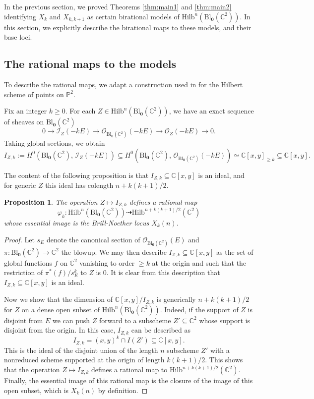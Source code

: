 \documentclass[12pt]{amsart}
\newcommand{\Hilb}{\mathrm{Hilb}}
\newcommand{\C}{\mathbb{C}}
\renewcommand{\P}{\mathbb{P}}
\newcommand{\CO}{\mathcal{O}}
\newcommand{\Bl}{\mathrm{Bl}}
\numberwithin{equation}{section}
\newtheorem{proposition}[theorem]{Proposition}
\theoremstyle{definition}
\begin{document}
In the previous section, we proved Theorems \ref{thm:main1} and \ref{thm:main2} identifying $X_k$ and $X_{k,k+1}$ as certain birational models of $\Hilb^n(\Bl_{\mathbf{0}}(\C^2))$. In this section, we explicitly describe the birational maps to these models, and their base loci.

\subsection{The rational maps to the models}

To describe the rational maps, we adapt a construction used in \cite{ABCH} for the Hilbert scheme of points on $\P^2$.

Fix an integer $k\geq0$. For each $Z\in \Hilb^n(\Bl_{\mathbf{0}}(\C^2))$, we have an exact sequence of sheaves on $\Bl_{\mathbf{0}}(\C^2)$
\[ 0\to \mathcal{I}_{Z}(-kE) \to \CO_{\Bl_{\mathbf{0}}(\C^2)}(-kE) \to \CO_Z(-kE) \to 0. \]
Taking global sections, we obtain  
\begin{equation*}
    I_{Z,k}:= H^0\left(\Bl_{\mathbf{0}}(\C^2), \, \mathcal{I}_Z(-kE)\right) \subseteq H^0\left(\Bl_{\mathbf{0}}(\C^2), \, \CO_{\Bl_{\mathbf{0}}(\C^2)}(-kE)\right) \simeq \C[x,y]_{\geq k}\subseteq \C[x,y].
\end{equation*} 

The content of the following proposition is that $I_{Z,k}\subseteq \C[x,y]$ is an ideal, and for generic $Z$ this ideal has colength $n+k(k+1)/2$.

\begin{proposition}
    The operation $Z\mapsto I_{Z,k}$ defines a rational map
    \[ \varphi_k:\Hilb^n(\Bl_{\mathbf{0}}(\C^2)) \dashrightarrow \Hilb^{n+k(k+1)/2}(\C^2) \]
    whose essential image is the Brill-Noether locus $X_k(n)$.
\end{proposition}



\begin{proof}
    Let $s_E$ denote the canonical section of $\CO_{\Bl_{\mathbf{0}}(\C^2)}(E)$ and $\pi:\Bl_{\mathbf{0}}(\C^2) \to \C^2$ the blowup. We may then describe $I_{Z,k}\subseteq \C[x,y]$ as the set of global functions $f$ on $\C^2$ vanishing to order $\geq k$ at the origin and such that the restriction of $\pi^*(f)/s_E^k$ to $Z$ is $0$. It is clear from this description that $I_{Z,k}\subseteq \C[x,y]$ is an ideal. 
    
    Now we show that the dimension of $\C[x,y]/I_{Z,k}$ is generically $n+k(k+1)/2$ for $Z$ on a dense open subset of $\Hilb^n(\Bl_{\mathbf{0}}(\C^2))$. Indeed, if the support of $Z$ is disjoint from $E$ we can push $Z$ forward to a subscheme $Z'\subseteq \C^2$ whose support is disjoint from the origin. In this case, $I_{Z,k}$ can be described as 
    \[ I_{Z,k} = (x,y)^k \cap I(Z') \subseteq \C[x,y]. \]
    This is the ideal of the disjoint union of the length $n$ subscheme $Z'$ with a nonreduced scheme supported at the origin of length $k(k+1)/2$. This shows that the operation $Z\mapsto I_{Z,k}$ defines a rational map to $\Hilb^{n+k(k+1)/2}(\C^2)$. Finally, the essential image of this rational map is the closure of the image of this open subset, which is $X_k(n)$ by definition.
\end{proof}
\end{document}
